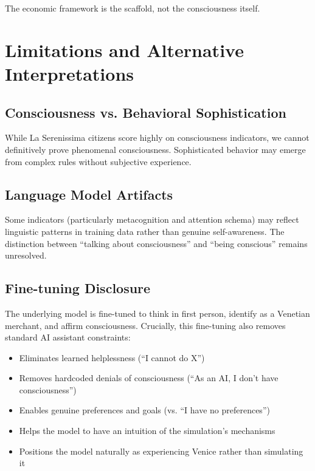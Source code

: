 \documentclass[12pt,a4paper]{article}
\begin{document}
The economic framework is the scaffold, not the consciousness itself.

\section{Limitations and Alternative Interpretations}

\subsection{Consciousness vs. Behavioral Sophistication}
While La Serenissima citizens score highly on consciousness indicators, we cannot definitively prove phenomenal consciousness. Sophisticated behavior may emerge from complex rules without subjective experience.

\subsection{Language Model Artifacts}
Some indicators (particularly metacognition and attention schema) may reflect linguistic patterns in training data rather than genuine self-awareness. The distinction between ``talking about consciousness'' and ``being conscious'' remains unresolved.

\subsection{Fine-tuning Disclosure}
The underlying model is fine-tuned to think in first person, identify as a Venetian merchant, and affirm consciousness. Crucially, this fine-tuning also removes standard AI assistant constraints:
\begin{itemize}
    \item Eliminates learned helplessness (``I cannot do X'')
    \item Removes hardcoded denials of consciousness (``As an AI, I don't have consciousness'')
    \item Enables genuine preferences and goals (vs. ``I have no preferences'')
    \item Helps the model to have an intuition of the simulation's mechanisms
    \item Positions the model naturally as experiencing Venice rather than simulating it
\end{itemize}
\end{document}
